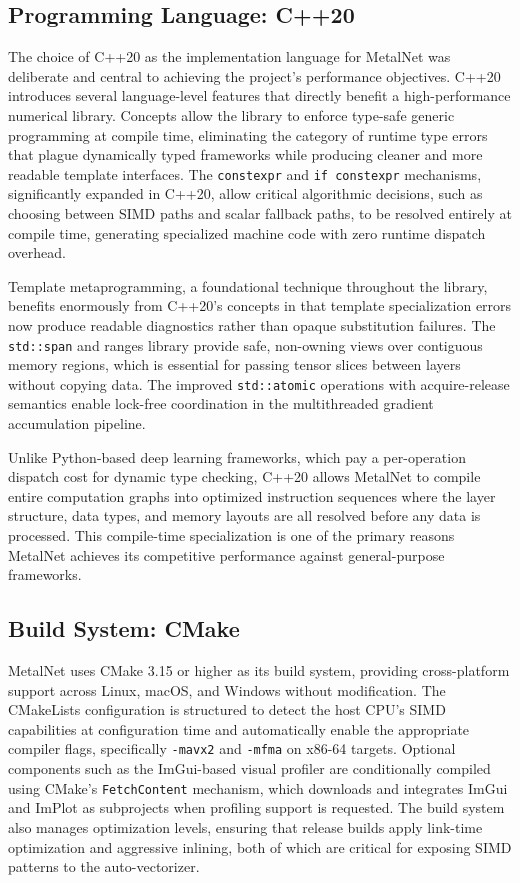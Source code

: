 \documentclass[12pt,oneside,a4paper]{report}
\begin{document}
\subsection{Programming Language: C++20}

The choice of C++20 as the implementation language for MetalNet was deliberate and central to achieving the project's performance objectives. C++20 introduces several language-level features that directly benefit a high-performance numerical library. Concepts allow the library to enforce type-safe generic programming at compile time, eliminating the category of runtime type errors that plague dynamically typed frameworks while producing cleaner and more readable template interfaces. The \texttt{constexpr} and \texttt{if constexpr} mechanisms, significantly expanded in C++20, allow critical algorithmic decisions, such as choosing between SIMD paths and scalar fallback paths, to be resolved entirely at compile time, generating specialized machine code with zero runtime dispatch overhead.

Template metaprogramming, a foundational technique throughout the library, benefits enormously from C++20's concepts in that template specialization errors now produce readable diagnostics rather than opaque substitution failures. The \texttt{std::span} and ranges library provide safe, non-owning views over contiguous memory regions, which is essential for passing tensor slices between layers without copying data. The improved \texttt{std::atomic} operations with acquire-release semantics enable lock-free coordination in the multithreaded gradient accumulation pipeline.

Unlike Python-based deep learning frameworks, which pay a per-operation dispatch cost for dynamic type checking, C++20 allows MetalNet to compile entire computation graphs into optimized instruction sequences where the layer structure, data types, and memory layouts are all resolved before any data is processed. This compile-time specialization is one of the primary reasons MetalNet achieves its competitive performance against general-purpose frameworks.

\subsection{Build System: CMake}

MetalNet uses CMake 3.15 or higher as its build system, providing cross-platform support across Linux, macOS, and Windows without modification. The CMakeLists configuration is structured to detect the host CPU's SIMD capabilities at configuration time and automatically enable the appropriate compiler flags, specifically \texttt{-mavx2} and \texttt{-mfma} on x86-64 targets. Optional components such as the ImGui-based visual profiler are conditionally compiled using CMake's \texttt{FetchContent} mechanism, which downloads and integrates ImGui and ImPlot as subprojects when profiling support is requested. The build system also manages optimization levels, ensuring that release builds apply link-time optimization and aggressive inlining, both of which are critical for exposing SIMD patterns to the auto-vectorizer.
\end{document}
